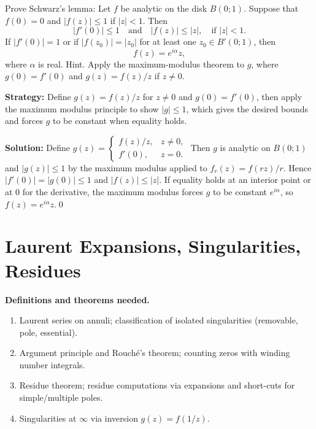 \begin{problembox}
Prove Schwarz's lemma: Let \( f \) be analytic on the disk \( B(0; 1) \). Suppose that \( f(0) = 0 \) and \( |f(z)| \leq 1 \) if \( |z| < 1 \). Then
\[ |f'(0)| \leq 1 \quad \text{and} \quad |f(z)| \leq |z|, \quad \text{if } |z| < 1. \]
If \( |f'(0)| = 1 \) or if \( |f(z_0)| = |z_0| \) for at least one \( z_0 \in B'(0; 1) \), then
\[ f(z) = e^{i\alpha} z, \]
where \( \alpha \) is real. Hint. Apply the maximum-modulus theorem to \( g \), where \( g(0) = f'(0) \) and \( g(z) = f(z)/z \) if \( z \neq 0 \).
\end{problembox}

\noindent\textbf{Strategy:} Define \( g(z) = f(z)/z \) for \( z \neq 0 \) and \( g(0) = f'(0) \), then apply the maximum modulus principle to show \( |g| \leq 1 \), which gives the desired bounds and forces \( g \) to be constant when equality holds.

\bigskip\noindent\textbf{Solution:}
Define $g(z)=\begin{cases} f(z)/z,& z\ne0,\\ f'(0),& z=0.\end{cases}$ Then $g$ is analytic on $B(0;1)$ and $|g(z)|\le1$ by the maximum modulus applied to $f_r(z)=f(rz)/r$. Hence $|f'(0)|=|g(0)|\le1$ and $|f(z)|\le |z|$. If equality holds at an interior point or at $0$ for the derivative, the maximum modulus forces $g$ to be constant $e^{i\alpha}$, so $f(z)=e^{i\alpha}z$.\qed
\section{Laurent Expansions, Singularities, Residues}

\noindent\textbf{Definitions and theorems needed.}
\begin{enumerate}[label=(\alph*)]
\item Laurent series on annuli; classification of isolated singularities (removable, pole, essential).
\item Argument principle and Rouché's theorem; counting zeros with winding number integrals.
\item Residue theorem; residue computations via expansions and short-cuts for simple/multiple poles.
\item Singularities at $\infty$ via inversion $g(z)=f(1/z)$.
\end{enumerate}



